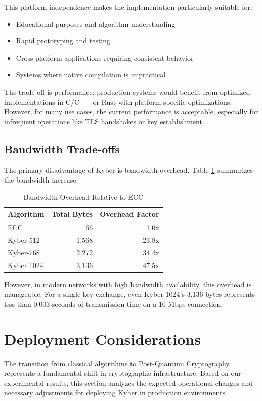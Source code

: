 This platform independence makes the implementation particularly suitable for:
\begin{itemize}
\item Educational purposes and algorithm understanding
\item Rapid prototyping and testing
\item Cross-platform applications requiring consistent behavior
\item Systems where native compilation is impractical
\end{itemize}

The trade-off is performance: production systems would benefit from optimized implementations in C/C++ or Rust with platform-specific optimizations. However, for many use cases, the current performance is acceptable, especially for infrequent operations like TLS handshakes or key establishment.

\subsection{Bandwidth Trade-offs}

The primary disadvantage of Kyber is bandwidth overhead. Table \ref{tab:bandwidth} summarizes the bandwidth increase:

\begin{table}[!htbp]
\centering
\caption{\label{tab:bandwidth}Bandwidth Overhead Relative to ECC}
\begin{tabular}{l|r|r}
\hline
\textbf{Algorithm} & \textbf{Total Bytes} & \textbf{Overhead Factor} \\ \hline
ECC & 66 & 1.0x \\
Kyber-512 & 1,568 & 23.8x \\
Kyber-768 & 2,272 & 34.4x \\
Kyber-1024 & 3,136 & 47.5x \\ \hline
\end{tabular}
\end{table}

However, in modern networks with high bandwidth availability, this overhead is manageable. For a single key exchange, even Kyber-1024's 3,136 bytes represents less than 0.003 seconds of transmission time on a 10 Mbps connection.

\section{Deployment Considerations}

The transition from classical algorithms to Post-Quantum Cryptography represents a fundamental shift in cryptographic infrastructure. Based on our experimental results, this section analyzes the expected operational changes and necessary adjustments for deploying Kyber in production environments.

